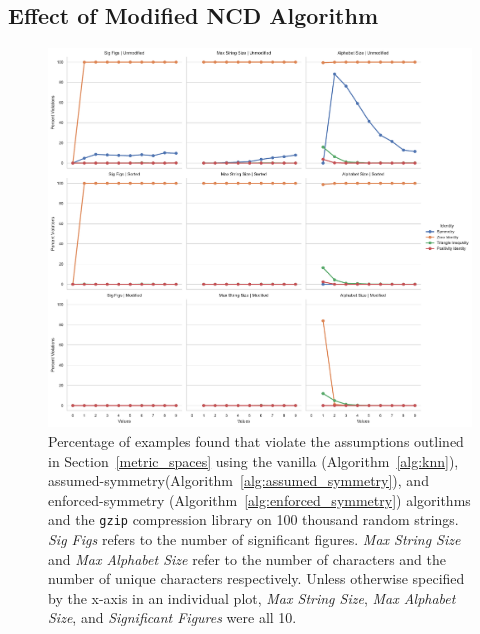 \documentclass[conference]{IEEEtran}
\begin{document}
\subsection{Effect of Modified NCD Algorithm}

\begin{figure}[htb]
    \centering
    \includegraphics[width=\textwidth]{images/ncd.pdf}
    \caption{Percentage of examples found that violate the assumptions outlined in Section~\ref{metric_spaces} using the vanilla (Algorithm~\ref{alg:knn}), assumed-symmetry(Algorithm~\ref{alg:assumed_symmetry}), and enforced-symmetry (Algorithm~\ref{alg:enforced_symmetry}) algorithms and the \texttt{gzip} compression library on 100 thousand random strings. \textit{Sig Figs} refers to the number of significant figures. \textit{Max String Size} and \textit{Max Alphabet Size} refer to the number of characters and the number of unique characters respectively. Unless otherwise specified by the x-axis in an individual plot, \textit{Max String Size}, \textit{Max Alphabet Size}, and \textit{Significant Figures} were all 10. }
    \label{fig:mod_assumptions}

\end{figure}
\end{document}
